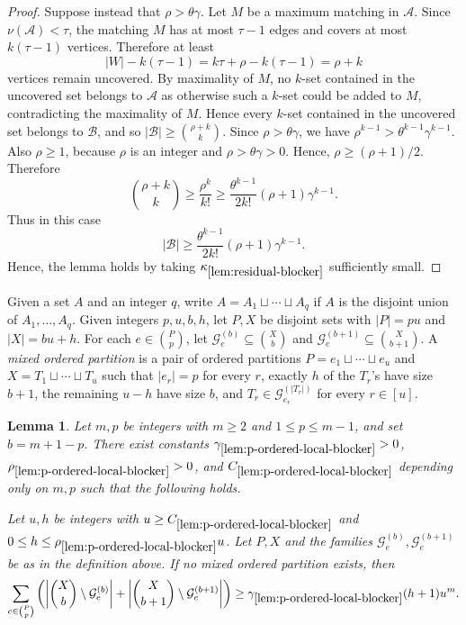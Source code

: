 \documentclass[10pt,a4paper]{article}
\numberwithin{equation}{section}
\newtheorem{lemma}[lemma]{Lemma}
\theoremstyle{definition}
\newcommand{\G}{\mathcal G}
\newcommand{\A}{\mathcal A}
\newcommand{\B}{\mathcal B}
\begin{document}
\begin{proof}
        Suppose instead that $\rho>\theta\gamma$.
        Let $M$ be a maximum matching in $\A$.
        Since $\nu(\A)<\tau$, the matching $M$ has at most $\tau-1$ edges and covers at most $k(\tau-1)$ vertices.
        Therefore at least
        \[
                |W|-k(\tau-1)
                =
                k\tau+\rho-k(\tau-1)
                =
                \rho+k
        \]
        vertices remain uncovered.
        By maximality of $M$, no $k$-set contained in the uncovered set belongs to $\A$ as otherwise such a $k$-set could be added to $M$, contradicting the maximality of $M$.
        Hence every $k$-set contained in the uncovered set belongs to $\B$, and so $|\B|\ge\binom{\rho+k}{k}$.
        Since $\rho>\theta\gamma$, we have $\rho^{k-1}>\theta^{k-1}\gamma^{k-1}$.
        Also $\rho\ge1$, because $\rho$ is an integer and $\rho>\theta\gamma>0$.
        Hence, $\rho\ge (\rho+1)/2$.
        Therefore
        \[
                \binom{\rho+k}{k}
                \ge
                \frac{\rho^k}{k!}
                \ge
                \frac{\theta^{k-1}}{2k!}(\rho+1)\gamma^{k-1}.
        \]
        Thus in this case
        \[
                |\B|
                \ge
                \frac{\theta^{k-1}}{2k!}(\rho+1)\gamma^{k-1}.
        \]
        Hence, the lemma holds by taking $\kappa_{\ref{lem:residual-blocker}}$ sufficiently small.
\end{proof}

Given a set $A$ and an integer $q$, write $A=A_1\sqcup\cdots\sqcup A_q$ if $A$ is the disjoint union of $A_1,\ldots,A_q$.
Given integers $p,u,b,h$, let $P,X$ be disjoint sets with $|P|=pu$ and
$|X|=bu+h$. For each $e\in\binom Pp$, let
$\G_e^{(b)}\subseteq\binom Xb$ and
$\G_e^{(b+1)}\subseteq\binom X{b+1}$.
A \emph{mixed ordered partition} is a pair of ordered partitions $P=e_1\sqcup\cdots\sqcup e_u$ and $X=T_1\sqcup\cdots\sqcup T_u$ such that $|e_r|=p$ for every $r$, exactly $h$ of the $T_r$'s have
size $b+1$, the remaining $u-h$ have size $b$, and
$T_r\in\G_{e_r}^{(|T_r|)}$ for every $r\in[u]$.

\begin{lemma}\label{lem:p-ordered-local-blocker}
        Let $m,p$ be integers with $m\ge2$ and $1\le p\le m-1$, and set
        $b=m+1-p$. There exist constants
        $\gamma_{\ref{lem:p-ordered-local-blocker}}>0$,
        $\rho_{\ref{lem:p-ordered-local-blocker}}>0$, and
        $C_{\ref{lem:p-ordered-local-blocker}}$ depending only on
        $m,p$ such that the following holds.

        Let $u,h$ be integers with
        $u\ge C_{\ref{lem:p-ordered-local-blocker}}$ and
        $0\le h\le\rho_{\ref{lem:p-ordered-local-blocker}}u$.
        Let $P,X$ and the families $\G_e^{(b)},\G_e^{(b+1)}$ be as in the definition above.
        If no mixed ordered partition exists, then
        \[
                \sum_{e\in\binom Pp}
                \left(
                \left|\binom Xb\setminus\G_e^{(b)}\right|
                +
                \left|\binom X{b+1}\setminus\G_e^{(b+1)}\right|
                \right)
                \ge \gamma_{\ref{lem:p-ordered-local-blocker}}(h+1)u^m.
        \]
\end{lemma}
\end{document}
